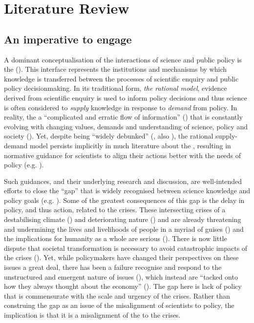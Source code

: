 \chapter{Literature Review}\label{ch:lit}

\section{An imperative to engage}\label{sec:litspi}

A dominant conceptualisation of the interactions of science and public policy is the \SPI{} (\cite{JagannathanEtAl2023}). This interface represents the institutions and mechanisms by which knowledge is transferred between the processes of scientific enquiry and public policy decisionmaking. In its traditional form, \emph{the rational model}, evidence derived from scientific enquiry is used to inform policy decisions and thus science is often considered to \emph{supply} knowledge in response to \emph{demand} from policy. In reality, the \SPI{} a ``complicated and erratic flow of information'' (\cite{BednarekSHG2015}) that is constantly evolving with changing values, demands and understanding of science, policy and society (\cite{Obermeister2020}). Yet, despite being ``widely debunked'' (\cite{BoswellS2017}, also \cite{McNie2007,HaynesDCRHGS2011,Cairney2018}), the rational supply-demand model persists implicitly in much literature about the \SPI, resulting in normative guidance for scientists to align their actions better with the needs of policy (e.g. \cite{McNie2007,GeddesDP2018,BlessenohlS2022,Bisbal2024}).

Such guidances, and their underlying research and discussion, are well-intended efforts to close the ``gap'' that is widely recognised between science knowledge and policy goals (e.g. \cite{RapleyD2014,KarlssonG2020,CairneyTS2023}). Some of the greatest consequences of this gap is the delay in policy, and thus action, related to the \CAN{} crises. These intersecting crises of a destabilising climate (\cite{IIPCC2022}) and deteriorating nature (\cite{IPBES2022}) and are already threatening and undermining the lives and livelihoods of people in a myriad of guises (\cite{TschakertEAKO2019}) and the implications for humanity as a whole are serious (\cite{McKayEtAl2022,WEF2024}). There is now little dispute that societal transformation is necessary to avoid catastrophic impacts of the \CAN{} crises (\cite{LaybournTS2023}). Yet, while policymakers have changed their perspectives on these issues a great deal, there has been a failure recognise and respond to the unstructured and emergent nature of \CAN{} issues (\cite{FuntowiczR1993,WesselinkH2020}), which instead are ``tacked onto how they always thought about the economy'' (\cite[p118]{Killick2023}). The gap here is lack of policy that is commensurate with the scale and urgency of the \CAN{} crises. Rather than construing the gap as an issue of the misalignment of scientists to policy, the implication is that it is a misalignment of the \SPI{} to the \CAN{} crises.

